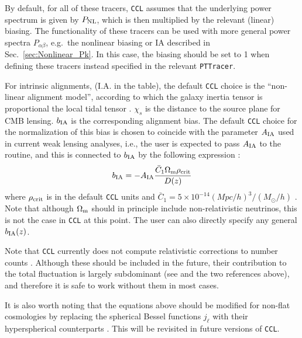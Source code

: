 \documentclass[\docopts]{\docclass}
\newcommand{\ccl}{{\tt CCL}\xspace}
\begin{document}
By default, for all of these tracers, \ccl assumes that the underlying power spectrum
is given by $P_{\rm NL}$, which is then multiplied by the relevant (linear) biasing.
The functionality of these tracers can be used with more general power spectra $P_{\alpha\beta}$,
e.g.\ the nonlinear biasing or IA described in Sec.~\ref{sec:Nonlinear_Pk}. In this case,
the biasing should be set to 1 when defining these tracers instead specified in the relevant {\tt PTTracer}.

For intrinsic alignments, (I.A. in the table), the default \ccl
choice is the ``non-linear alignment model'', according to which the
galaxy inertia tensor is proportional the local tidal tensor
\citep{2004PhRvD..70f3526H,2007MNRAS.381.1197H}. $\chi_s$ is the distance to
the source plane for CMB lensing. $b_{\rm IA}$ is the corresponding alignment
bias. The default \ccl choice for the normalization of this bias
is chosen to coincide with the parameter $A_{\rm IA}$ used in current weak
lensing analyses, i.e., the user is expected to pass $A_{\rm IA}$ to the routine,
and this is connected to $b_{\rm IA}$ by the following expression \cite[Eq. 6]{Joachimi11}:
\begin{equation}
    \label{eq:bIA_norm}
    b_{\rm IA} = - A_{\rm IA} \frac{\bar{C}_1 \Omega_{\rm m} \rho_{\rm crit}}{D(z)}
\end{equation}
where $\rho_{\rm crit}$ is in the default \ccl units and
$\bar{C}_1= 5\times 10^{-14} (Mpc/h)^3 / (M_\odot/h)$ \citep{Brown02,Bridle07}.
Note that although $\Omega_{\rm m}$ should in principle include non-relativistic
neutrinos, this is not the case in \ccl at this point. The user can also directly
specify any general $b_{\rm IA}(z)$.

Note that \ccl currently does not compute relativistic corrections to number
counts \cite{2011PhRvD..84d3516C,2011PhRvD..84f3505B}. Although these should be
included in the future, their contribution to the total fluctuation is largely
subdominant (see \cite{GReffects} and the two references above), and therefore
it is safe to work without them in most cases.

It is also worth noting that the equations above should be modified for non-flat
cosmologies by replacing the spherical Bessel functions $j_\ell$ with their
hyperspherical counterparts \cite{1994ApJ...432....7K}. This will be revisited
in future versions of \ccl.
\end{document}
